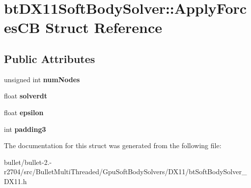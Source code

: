 \hypertarget{structbt_d_x11_soft_body_solver_1_1_apply_forces_c_b}{\section{bt\+D\+X11\+Soft\+Body\+Solver\+:\+:Apply\+Forces\+C\+B Struct Reference}
\label{structbt_d_x11_soft_body_solver_1_1_apply_forces_c_b}
}
\subsection*{Public Attributes}
\begin{DoxyCompactItemize}
\item 
\hypertarget{structbt_d_x11_soft_body_solver_1_1_apply_forces_c_b_a3f507da3dd0db440a0caba553016dd8e}{unsigned int {\bfseries num\+Nodes}}\label{structbt_d_x11_soft_body_solver_1_1_apply_forces_c_b_a3f507da3dd0db440a0caba553016dd8e}

\item 
\hypertarget{structbt_d_x11_soft_body_solver_1_1_apply_forces_c_b_a1e054c9d6f0e33c6fc037cd80e68dc34}{float {\bfseries solverdt}}\label{structbt_d_x11_soft_body_solver_1_1_apply_forces_c_b_a1e054c9d6f0e33c6fc037cd80e68dc34}

\item 
\hypertarget{structbt_d_x11_soft_body_solver_1_1_apply_forces_c_b_aaaa330af6165c373d127e120e73c2b22}{float {\bfseries epsilon}}\label{structbt_d_x11_soft_body_solver_1_1_apply_forces_c_b_aaaa330af6165c373d127e120e73c2b22}

\item 
\hypertarget{structbt_d_x11_soft_body_solver_1_1_apply_forces_c_b_a3ae26609b368192dc567bbc7427c9ab6}{int {\bfseries padding3}}\label{structbt_d_x11_soft_body_solver_1_1_apply_forces_c_b_a3ae26609b368192dc567bbc7427c9ab6}

\end{DoxyCompactItemize}


The documentation for this struct was generated from the following file\+:\begin{DoxyCompactItemize}
\item 
bullet/bullet-\/2.-\/r2704/src/\+Bullet\+Multi\+Threaded/\+Gpu\+Soft\+Body\+Solvers/\+D\+X11/bt\+Soft\+Body\+Solver\+\_\+\+D\+X11.\+h\end{DoxyCompactItemize}
